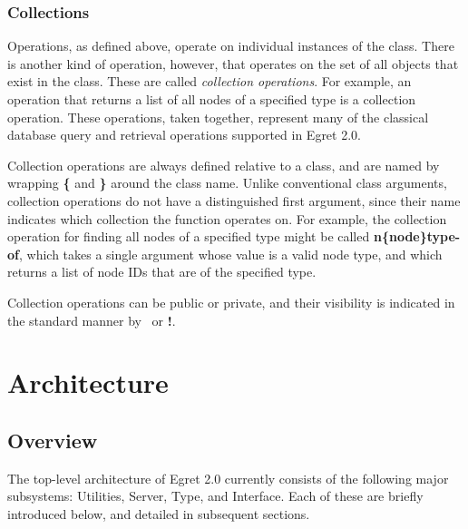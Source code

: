 \subsection{Collections}

Operations, as defined above, operate on individual instances of the
class. There is another kind of operation, however, that operates on
the set of all objects that exist in the class. These are called {\em
collection operations}.  For example, an operation that returns a list
of all nodes of a specified type is a collection operation.  These
operations, taken together, represent many of the classical database
query and retrieval operations supported in Egret 2.0.

Collection operations are always defined relative to a class, and are
named by wrapping {\bf \{} and {\bf \}} around the class name.  Unlike
conventional class arguments, collection operations do not have a
distinguished first argument, since their name indicates which
collection the function operates on.  For example, the collection
operation for finding all nodes of a specified type might be called
{\bf n\STAR \{node\}\STAR type-of}, which takes a single argument whose value is a
valid node type, and which returns a list of node IDs that are of the 
specified type.

Collection operations can be public or private, and their visibility is
indicated in the standard manner by \STAR\ or {\bf !}.

\chapter{Architecture}
\section{Overview}

The top-level architecture of Egret 2.0 currently consists of the following
major subsystems:  Utilities, Server, Type, and Interface.  Each of these
are briefly introduced below, and detailed in subsequent sections.

